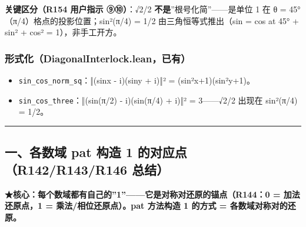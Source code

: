 \documentclass[
]{article}
\providecommand{\tightlist}{%
 \setlength{\itemsep}{0pt}\setlength{\parskip}{0pt}}
\begin{document}
\textbf{关键区分（R154 用户指示 ⑨⑩）}：√2/2
\textbf{不是}''根号化简''------是单位 1 在 θ =
45°（π/4）格点的投影位置；sin²(π/4) = 1/2 由三角恒等式推出（sin = cos at
45° + sin² + cos² = 1），非手工开方。

\subsubsection{形式化（DiagonalInterlock.lean，已有）}\label{ux5f62ux5f0fux5316diagonalinterlock.leanux5df2ux6709}

\begin{itemize}
\tightlist
\item
 \texttt{sin\_cos\_norm\_sq}：‖(sinx - i)(siny + i)‖² =
 (sin²x+1)(sin²y+1)。
\item
 \texttt{sin\_cos\_three}：‖(sin(π/2) - i)(sin(π/4) + i)‖² =
 3------√2/2 出现在 sin²(π/4) = 1/2。
\end{itemize}

\begin{center}\rule{0.5\linewidth}{0.5pt}\end{center}

\subsection{一、各数域 pat 构造 1 的对应点（R142/R143/R146
总结）}\label{ux4e00ux5404ux6570ux57df-pat-ux6784ux9020-1-ux7684ux5bf9ux5e94ux70b9r142r143r146-ux603bux7ed3}

\textbf{★核心：每个数域都有自己的''1''------它是对称对还原的锚点（R144：0
= 加法还原点，1 = 乘法/相位还原点）。pat 方法构造 1 的方式 =
各数域对称对的还原。}
\end{document}
